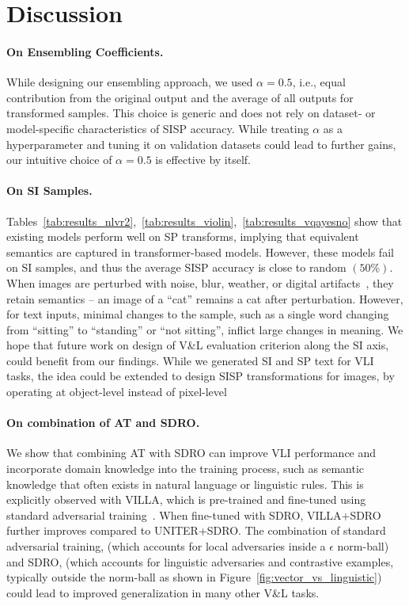 \section{Discussion}
\paragraph{On Ensembling Coefficients.}
While designing our ensembling approach, we used $\alpha=0.5$, i.e., equal contribution from the original output and the average of all outputs for transformed samples.
This choice is generic and does not rely on dataset- or model-specific characteristics of SISP accuracy.
While treating $\alpha$ as a hyperparameter and tuning it on validation datasets could lead to further gains, our intuitive choice of $\alpha{=}0.5$ is effective by itself.

\paragraph{On SI Samples.}
Tables~\ref{tab:results_nlvr2},~\ref{tab:results_violin},~\ref{tab:results_vqayesno} show that existing models perform well on SP transforms, implying that equivalent semantics are captured in transformer-based models.
However, these models fail on SI samples, and thus the average SISP accuracy is close to random $(50\%)$. 
When images are perturbed with noise, blur, weather, or digital artifacts~\citep{hendrycks2018benchmarking}, they retain semantics -- an image of a ``cat'' remains a cat after perturbation.
However, for text inputs, minimal changes to the sample, such as a single word changing from ``sitting'' to ``standing'' or ``not sitting'', inflict large changes in meaning.
We hope that future work on design of V\&L evaluation criterion along the SI axis, could benefit from our findings.
While we generated SI and SP text for VLI tasks, the idea could be extended to design SISP transformations for images, by operating at object-level instead of pixel-level

\paragraph{On combination of AT and SDRO.}
We show that combining AT with SDRO can improve VLI performance and incorporate domain knowledge into the training process, such as semantic knowledge that often exists in natural language or linguistic rules.
This is explicitly observed with VILLA, which is pre-trained and fine-tuned using standard adversarial training~\citep{gan2020large}.
When fine-tuned with SDRO, VILLA+SDRO further improves compared to UNITER+SDRO.
The combination of standard adversarial training, (which accounts for local adversaries inside a $\epsilon$ norm-ball) and SDRO, (which accounts for linguistic adversaries and contrastive examples, typically outside the norm-ball as shown in Figure~\ref{fig:vector_vs_linguistic}) could lead to improved generalization in many other V\&L tasks.

